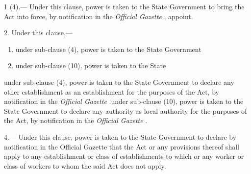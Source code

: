 \documentclass[gaz8,ordinance]{mhact}
\begin{document}
\begin{mrdl}

  
\begin{dllist}

        \item{1 (4).— Under this clause, power is taken to the State 
Government to bring the Act into force, by notification in the 
   \emph{Official
Gazette}
  , appoint.}
      
        \item{2. Under this clause,—

\begin{enumerate}[label=(\arabic*)]
      \item under sub-clause (4), power is taken to the State Government
      \item under sub-clause (10), power is taken to the State
\end{enumerate}
under sub-clause (4), power is taken to the State Government 
	to declare any other establishment as an establishment for the 
	purposes of the Act, by notification in the 
   \emph{Official Gazette}
  .under sub-clause (10), power is taken to the State 
	Government to declare any authority as local authority for the 
	purposes of the Act, by notification in the 
   \emph{Official Gazette}
  .}
      
        \item{4.— Under this clause, power is taken to the State 
Government to declare by notification in the Official Gazette that the 
Act or any provisions thereof shall apply to any establishment or class 
of establishments to which or any worker or class of workers to whom 
the said Act does not apply.}
      \end{dllist}


\end{mrdl}

             
\end{document}

